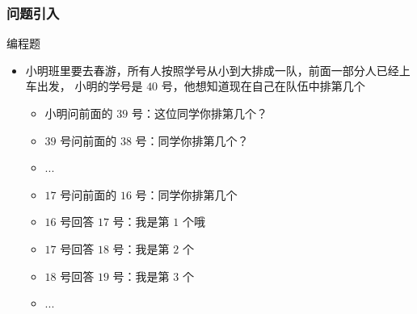 \begin{frame}[fragile]
    \frametitle{问题引入}
    \begin{exampleblock}{编程题}
        \begin{itemize}
            \item 小明班里要去春游，所有人按照学号从小到大排成一队，前面一部分人已经上车出发，
                小明的学号是 $40$ 号，他想知道现在自己在队伍中排第几个   

            \begin{itemize}
                \item<2-> 小明问前面的 $39$ 号：这位同学你排第几个？
                \item<2-> $39$ 号问前面的 $38$ 号：同学你排第几个？
                \item<2-> ...
                \item<2-> $17$ 号问前面的 $16$ 号：同学你排第几个
                \item<3-> $16$ 号回答 $17$ 号：我是第 $1$ 个哦
                \item<4-> $17$ 号回答 $18$ 号：我是第 $2$ 个
                \item<5-> $18$ 号回答 $19$ 号：我是第 $3$ 个
                \item<5-> ...
            \end{itemize}

        \end{itemize}
    \end{exampleblock}

\end{frame}

